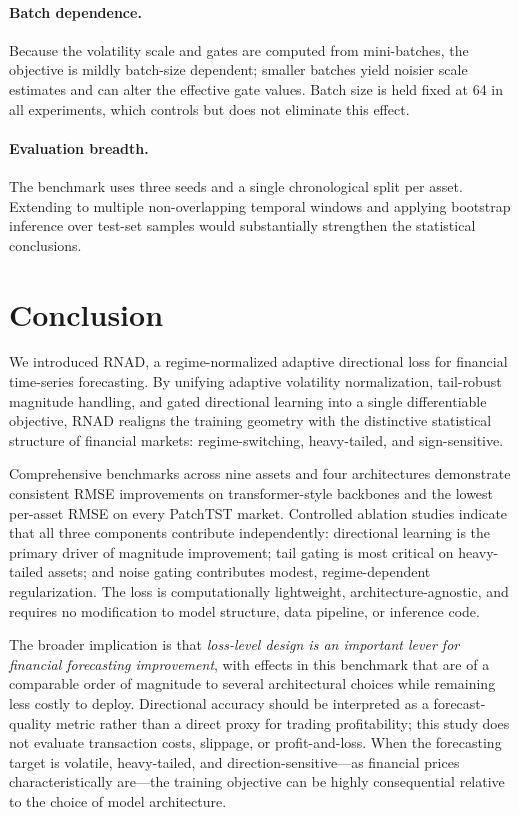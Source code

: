 \documentclass[11pt]{article}
\newcommand{\RNAD}{RNAD\xspace}
\begin{document}
\paragraph{Batch dependence.}
Because the volatility scale and gates are computed from mini-batches,
the objective is mildly batch-size dependent; smaller batches yield
noisier scale estimates and can alter the effective gate values.
Batch size is held fixed at 64 in all experiments, which controls
but does not eliminate this effect.

\paragraph{Evaluation breadth.}
The benchmark uses three seeds and a single chronological split per
asset. Extending to multiple non-overlapping temporal windows and
applying bootstrap inference over test-set samples would substantially
strengthen the statistical conclusions.

\FloatBarrier
\section{Conclusion}
\label{sec:conclusion}

We introduced \RNAD, a regime-normalized adaptive directional loss
for financial time-series forecasting. By unifying adaptive volatility
normalization, tail-robust magnitude handling, and gated directional
learning into a single differentiable objective, \RNAD realigns the
training geometry with the distinctive statistical structure of
financial markets: regime-switching, heavy-tailed, and sign-sensitive.

Comprehensive benchmarks across nine assets and four architectures
demonstrate consistent RMSE improvements on transformer-style
backbones and the lowest per-asset RMSE on every PatchTST market.
Controlled ablation studies indicate that all three components
contribute independently: directional learning is the primary driver
of magnitude improvement; tail gating is most critical on
heavy-tailed assets; and noise gating contributes modest,
regime-dependent regularization. The loss is computationally
lightweight, architecture-agnostic, and requires no modification
to model structure, data pipeline, or inference code.

The broader implication is that \emph{loss-level design is an
important lever for financial forecasting improvement}, with effects
in this benchmark that are of a comparable order of magnitude to
several architectural choices while remaining less costly to deploy.
Directional accuracy should be interpreted as a forecast-quality
metric rather than a direct proxy for trading profitability; this
study does not evaluate transaction costs, slippage, or
profit-and-loss. When the forecasting target is volatile,
heavy-tailed, and direction-sensitive---as financial prices
characteristically are---the training objective can be highly
consequential relative to the choice of model architecture.
\end{document}
